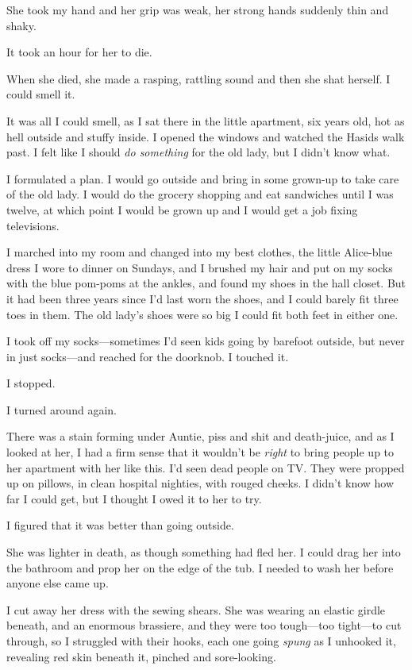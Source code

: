 She took my hand and her grip was weak, her strong hands suddenly thin
and shaky.

It took an hour for her to die.

When she died, she made a rasping, rattling sound and then she shat
herself.  I could smell it.

It was all I could smell, as I sat there in the little apartment, six
years old, hot as hell outside and stuffy inside.  I opened the
windows and watched the Hasids walk past.  I felt like I should
\textit{do something} for the old lady, but I didn't know what.

I formulated a plan.  I would go outside and bring in some grown-up to
take care of the old lady.  I would do the grocery shopping and eat
sandwiches until I was twelve, at which point I would be grown up and
I would get a job fixing televisions.

I marched into my room and changed into my best clothes, the little
Alice-blue dress I wore to dinner on Sundays, and I brushed my hair
and put on my socks with the blue pom-poms at the ankles, and found my
shoes in the hall closet.  But it had been three years since I'd last
worn the shoes, and I could barely fit three toes in them.  The old
lady's shoes were so big I could fit both feet in either one.

I took off my socks---sometimes I'd seen kids going by barefoot
outside, but never in just socks---and reached for the doorknob.  I
touched it.

I stopped.

I turned around again.

There was a stain forming under Auntie, piss and shit and death-juice,
and as I looked at her, I had a firm sense that it wouldn't be
\textit{right} to bring people up to her apartment with her like this. 
I'd seen dead people on TV.  They were propped up on pillows, in clean
hospital nighties, with rouged cheeks.  I didn't know how far I could
get, but I thought I owed it to her to try.

I figured that it was better than going outside.

She was lighter in death, as though something had fled her.  I could
drag her into the bathroom and prop her on the edge of the tub.  I
needed to wash her before anyone else came up.

I cut away her dress with the sewing shears.  She was wearing an
elastic girdle beneath, and an enormous brassiere, and they were too
tough---too tight---to cut through, so I struggled with their hooks,
each one going \textit{spung} as I unhooked it, revealing red skin
beneath it, pinched and sore-looking.

